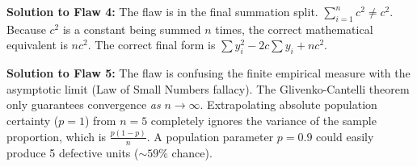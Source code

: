 \documentclass[11pt]{article}
\theoremstyle{definition}
\theoremstyle{remark}
\begin{document}
\textbf{Solution to Flaw 4:}
The flaw is in the final summation split. $\sum_{i=1}^n c^2 \neq c^2$. Because $c^2$ is a constant being summed $n$ times, the correct mathematical equivalent is $n c^2$. The correct final form is $\sum y_i^2 - 2c\sum y_i + nc^2$.

\textbf{Solution to Flaw 5:}
The flaw is confusing the finite empirical measure with the asymptotic limit (Law of Small Numbers fallacy). The Glivenko-Cantelli theorem only guarantees convergence \textit{as} $n \to \infty$. Extrapolating absolute population certainty ($p=1$) from $n=5$ completely ignores the variance of the sample proportion, which is $\frac{p(1-p)}{n}$. A population parameter $p=0.9$ could easily produce 5 defective units ($\sim 59\%$ chance).
\end{document}
